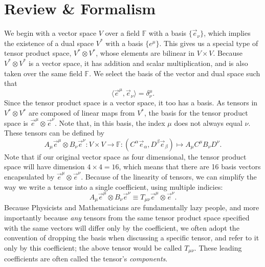 \section{Review \& Formalism}
We begin with a vector space $V$ over a field $\mathbb{F}$ with a basis $\{\vec{e}_\nu\}$, which implies the existence of a dual space $V^*$ with a basis $\{e^\mu\}$.
This gives us a special type of tensor product space, $ V^* \otimes V^*$, whose elements are bilinear in $V \times V$.
Because $V^* \otimes V^*$ is a vector space, it has addition and scalar multiplication, and is also taken over the same field $\mathbb{F}$.
We select the basis of the vector and dual space such that
\[ \langle \vec{e}^\mu, \vec{e}_\nu \rangle = \delta^\mu_\nu. \]
Since the tensor product space is a vector space, it too has a basis.
As tensors in $V^* \otimes V^*$ are composed of linear maps from $V^*$, the basis for the tensor product space is $\vec{e}^\mu \otimes \vec{e}^\nu$.
Note that, in this basis, the index $\mu$ does not always equal $\nu$.
These tensors can be defined by
\[ A_\mu \vec{e}^\mu \otimes B_\nu \vec{e}^\nu : V \times V \to \mathbb{F} : (C^\alpha \vec{e}_\alpha, D^\beta \vec{e}_\beta) \mapsto A_\mu C^\mu B_\nu D^\nu. \]
Note that if our original vector space as four dimensional, the tensor product space will have dimension $4 \times 4 = 16$, which means that there are 16 basis vectors encapsulated by $\vec{e}^\mu \otimes \vec{e}^\nu$.
Because of the linearity of tensors, we can simplify the way we write a tensor into a single coefficient, using multiple indicies:
\[ A_\mu \vec{e}^\mu \otimes B_\nu \vec{e}^\nu \equiv T_{\mu\nu} \vec{e}^\mu \otimes \vec{e}^\nu. \]
Because Physicists and Mathematicians are fundamentally lazy people, and more importantly because \emph{any} tensors from the same tensor product space specified with the same vectors will differ only by the coefficient, we often adopt the convention of dropping the basis when discussing a specific tensor, and refer to it only by this coefficient; the above tensor would be called $T_{\mu\nu}$. These leading coefficients are often called the tensor's \emph{components}.
